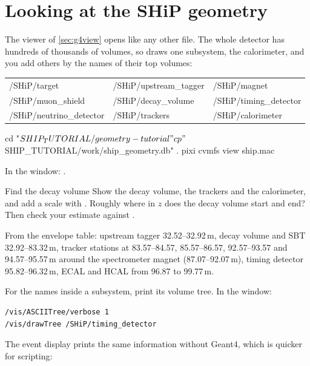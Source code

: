 \section{Looking at the SHiP geometry}
\label{sec:shipview}

The viewer of \cref{sec:g4view} opens  like any other
file. The whole detector has hundreds of thousands of volumes, so
 draws one subsystem, the calorimeter, and you add others by
the names of their top volumes:
\begin{center}\small\ttfamily
\begin{tabular}{lll}
/SHiP/target            & /SHiP/upstream\_tagger & /SHiP/magnet \\
/SHiP/muon\_shield      & /SHiP/decay\_volume    & /SHiP/timing\_detector \\
/SHiP/neutrino\_detector& /SHiP/trackers         & /SHiP/calorimeter \\
\end{tabular}
\end{center}
\begin{shell}
cd "$SHIP_TUTORIAL/geometry-tutorial"
cp "$SHIP_TUTORIAL/work/ship_geometry.db" .
pixi cvmfs view ship.mac
\end{shell}
In the window: .

\begin{exercise}{Find the decay volume}
Show the decay volume, the trackers and the calorimeter, and add a scale
with . Roughly where in $z$ does the decay
volume start and end? Then check your estimate against
.
\end{exercise}

\begin{solution}
From the envelope table: upstream tagger 32.52--32.92\,m, decay volume and
SBT 32.92--83.32\,m, tracker stations at 83.57--84.57, 85.57--86.57,
92.57--93.57 and 94.57--95.57\,m around the spectrometer magnet
(87.07--92.07\,m), timing detector 95.82--96.32\,m, ECAL and HCAL from
96.87 to 99.77\,m.
\end{solution}

For the names inside a subsystem, print its volume tree. In the window:
\begin{lstlisting}[language=g4mac]
/vis/ASCIITree/verbose 1
/vis/drawTree /SHiP/timing_detector
\end{lstlisting} The event display prints the same
information without Geant4, which is quicker for scripting:

